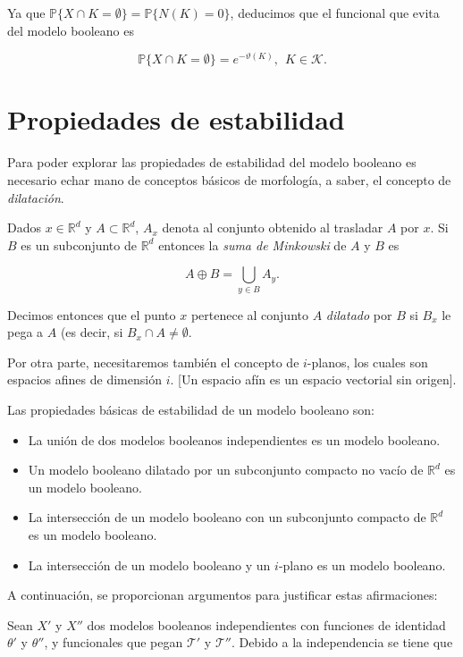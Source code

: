 Ya que $\mathbb{P}\{X\cap K=\emptyset\}=\mathbb{P}\{N(K)=0\}$, deducimos que el funcional que evita del modelo booleano es

\[\mathbb{P}\{X\cap K=\emptyset\}=e^{-\vartheta(K)},\ \ K\in\mathcal{K}.\]

\section{Propiedades de estabilidad}

Para poder explorar las propiedades de estabilidad del modelo booleano es necesario echar mano de conceptos b\'asicos de morfolog\'ia, a saber, el concepto de \textit{dilataci\'on}.

 Dados $x\in\mathbb{R}^d$ y $A\subset\mathbb{R}^d$, $A_x$ denota al conjunto obtenido al trasladar $A$ por $x$. Si $B$ es un subconjunto de $\mathbb{R}^d$ entonces la \textit{suma de Minkowski} de $A$ y $B$ es

\[A\oplus B = \bigcup_{y\in B}A_y.\]

Decimos entonces que el punto $x$ pertenece al conjunto $A$ \textit{dilatado} por $B$ si $B_x$ le pega a $A$ (es decir, si $B_x\cap A\neq\emptyset$.

Por otra parte, necesitaremos tambi\'en el concepto de $i$-planos, los cuales son espacios afines de dimensi\'on $i$. [Un espacio af\'in es un espacio vectorial sin origen].

Las propiedades b\'asicas de estabilidad de un modelo booleano son:

\begin{itemize}
	\item La uni\'on de dos modelos booleanos independientes es un modelo booleano.
	\item Un modelo booleano dilatado por un subconjunto compacto no vac\'io de $\mathbb{R}^d$ es un modelo booleano.
	\item La intersecci\'on de un modelo booleano con un subconjunto compacto de $\mathbb{R}^d$ es un modelo booleano.
	\item La intersecci\'on de un modelo booleano y un $i$-plano es un modelo booleano.
\end{itemize}

A continuaci\'on, se proporcionan argumentos para justificar estas afirmaciones:

Sean $X'$ y $X''$ dos modelos booleanos independientes con funciones de identidad $\theta'$ y $\theta''$, y funcionales que pegan $\mathcal{T}'$ y $\mathcal{T}''$. Debido a la independencia se tiene que

